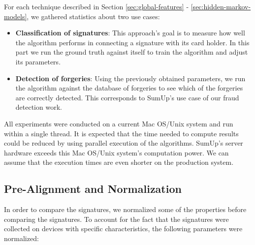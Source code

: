 \documentclass[a4paper, oneside]{csthesis}
\begin{document}
For each technique described in Section \ref{sec:global-features} - \ref{sec:hidden-markov-models}, we gathered statistics about two use cases:
\begin{itemize}
\item \textbf{Classification of signatures}: This approach's goal is to measure how well the algorithm performs in connecting a signature with its card holder. In this part we run the ground truth against itself to train the algorithm and adjust its parameters.
\item \textbf{Detection of forgeries}: Using the previously obtained parameters, we run the algorithm against the database of forgeries to see which of the forgeries are correctly detected. This corresponds to SumUp's use case of our fraud detection work.
\end{itemize}

All experiments were conducted on a current Mac OS/Unix system and run within a single thread. It is expected that the time needed to compute results could be reduced by using parallel execution of the algorithms. SumUp's server hardware exceeds this Mac OS/Unix system's computation power. We can assume that the execution times are  even shorter on the production system.

\subsection{Pre-Alignment and Normalization}

In order to compare the signatures, we normalized some of the properties before comparing the signatures. To account for the fact that the signatures were collected on devices with specific characteristics, the following parameters were normalized:
\end{document}
